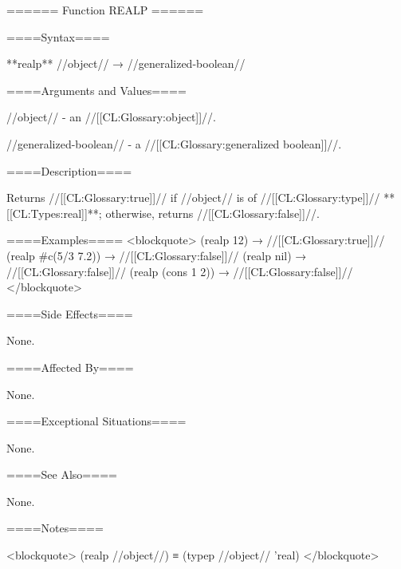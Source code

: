 ====== Function REALP ======

====Syntax====

**realp** //object// → //generalized-boolean//

====Arguments and Values====

//object// - an //[[CL:Glossary:object]]//.

//generalized-boolean// - a //[[CL:Glossary:generalized boolean]]//.

====Description====

Returns //[[CL:Glossary:true]]// if //object// is of //[[CL:Glossary:type]]// **[[CL:Types:real]]**; otherwise, returns //[[CL:Glossary:false]]//.

====Examples==== <blockquote> (realp 12) → //[[CL:Glossary:true]]// (realp #c(5/3 7.2)) → //[[CL:Glossary:false]]// (realp nil) → //[[CL:Glossary:false]]// (realp (cons 1 2)) → //[[CL:Glossary:false]]// </blockquote>

====Side Effects====

None.

====Affected By====

None.

====Exceptional Situations====

None.

====See Also====

None.

====Notes====

<blockquote> (realp //object//) ≡ (typep //object// 'real) </blockquote>

